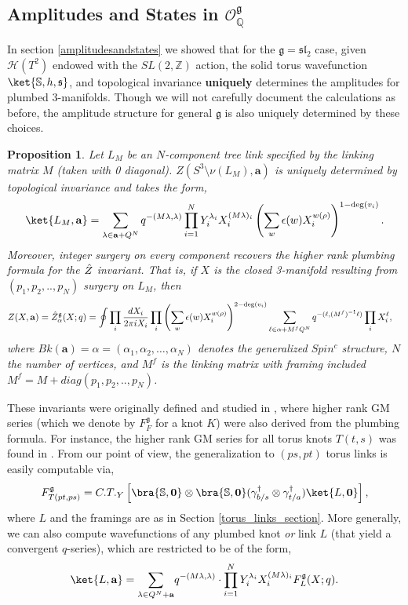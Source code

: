 \documentclass{article}
\def\be{\begin{equation}}
\def\ee{\end{equation}}
\newtheorem{proposition}{Proposition}[section]
\numberwithin{corollary}{theorem}
\numberwithin{corollary}{proposition}
\begin{document}
\subsection{Amplitudes and States in \texorpdfstring{$\mathcal{O}^\mathfrak{g}_\mathbb{Q}$}{OgQ}}
In section \ref{amplitudesandstates} we showed that for the $\mathfrak{g} = \mathfrak{sl}_2$ case, given $\mathcal{H}(T^{2})$ endowed with the $SL(2,\mathbb{Z})$ action, the solid torus wavefunction $\ket{\mathbb{S},h,\mathfrak{s}}$, and topological invariance \textbf{uniquely} determines the amplitudes for plumbed 3-manifolds. Though we will not carefully document the calculations as before, the amplitude structure for general $\mathfrak{g}$ is also uniquely determined by these choices. 


\begin{proposition}
     Let $L_M$ be an $N$-component tree link specified by the linking matrix $M$ (taken with 0 diagonal). $Z(S^3 \setminus \nu(L_M),\mathbf{a})$ is uniquely determined by topological invariance and takes the form,
\be \label{treelink_general_g} 
\ket{L_{M}, \mathbf{a} } = \sum_{\lambda \in \mathbf{a} + Q^N} q^{-(M\lambda,\lambda)} \prod^N_{i=1} Y^{\lambda_i}_{i} X_i^{(M\lambda)_i} \left(\sum_w \epsilon(w)X_i^{w(\rho)}\right)^{1-\mathrm{deg}(v_{i})} .
\ee 
Moreover, integer surgery on every component recovers the higher rank plumbing formula for the $\Hat{Z}$ invariant. That is, if $X$ is the closed 3-manifold resulting from $(p_1,p_2,..,p_N)$ surgery on $L_M$, then
\begin{align}
  Z(X,\mathbf{a}) =\Hat{Z}^\mathfrak{g}_\alpha(X;q) & = \oint  \prod_{i}   \frac{dX_i}{2\pi i X_i}  \prod_{i} \left(\sum_w \epsilon(w)X_i^{w(\rho)}\right)^{2-\mathrm{deg}( v_i)}  \sum_{ \ell \in  \alpha + M^{f} Q^{N }} q^{-(\ell,(M^f)^{-1}\ell)} \prod_{i} X_{i}^{\ell},
\end{align}
where $Bk(\mathbf{a}) =\alpha = (\alpha_1,\alpha_2,\ldots,\alpha_N)$ denotes the generalized $Spin^c$ structure, $N$ the number of vertices, and $M^f$ is the linking matrix with framing included $M^f = M + diag(p_1,p_2,..,p_N)$. 
\end{proposition}

These invariants were originally defined and studied in \cite{P3}, where higher rank GM series (which we denote by $F^\mathfrak{g}_F$ for a knot $K$) were also derived from the plumbing formula. For instance, the higher rank GM series for all torus knots $T(t,s)$ was found in \cite{P3}. From our point of view, the generalization to $(ps,pt)$ torus links is easily computable via,
$$F^\mathfrak{g}_{T(pt,ps)} = C.T._Y \left[ \bra{\mathbb{S},\mathbf{0}}\otimes\bra{\mathbb{S},\mathbf{0}} (\gamma^\dagger_{b/s}\otimes\gamma^\dagger_{t/a})\ket{L,\mathbf{0}}\right],$$
where $L$ and the framings are as in Section \ref{torus_links_section}. More generally, we can also compute wavefunctions of any plumbed knot \textit{or} link $L$ (that yield a convergent $q$-series), which are restricted to be of the form,
$$\ket{L,\mathbf{a}} = \underset{}{\sum_{\lambda \in Q^N+\mathbf{a}}} q^{-(M\lambda,\lambda)} \cdot \prod^N_{i=1} Y^{\lambda_i}_{i}  X_i^{(M\lambda)_i} F^\mathfrak{g}_L(X;q).$$
\end{document}
